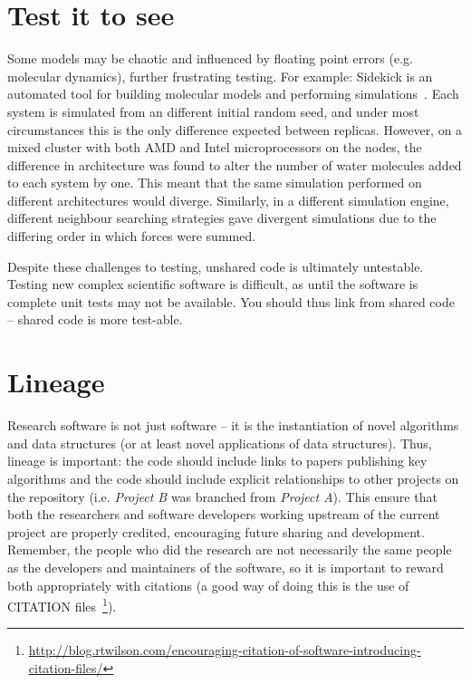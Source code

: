 \documentclass[conference]{IEEEtran}
\begin{document}
\section{Test it to see}

Some models may be chaotic and influenced by floating point errors
(e.g. molecular dynamics), further frustrating testing. For example:
Sidekick is an automated tool for building molecular models and
performing simulations~\cite{Hall2014Sidekick}. Each system is
simulated from an different initial random seed, and under most
circumstances this is the only difference expected between
replicas. However, on a mixed cluster with both AMD and Intel
microprocessors on the nodes, the difference in architecture was found
to alter the number of water molecules added to each system by
one. This meant that the same simulation performed on different
architectures would diverge. Similarly, in a different simulation
engine, different neighbour searching strategies gave divergent
simulations due to the differing order in which forces were summed.

Despite these challenges to testing, unshared code is ultimately
untestable.  Testing new complex scientific software is difficult, as
until the software is complete unit tests may not be available. You
should thus link from shared code -- shared code is more test-able.

\section{Lineage} 

Research software is not just software -- it is the instantiation of
novel algorithms and data structures (or at least novel applications
of data structures). Thus, lineage is important: the code should
include links to papers publishing key algorithms and the
code should include explicit relationships to other projects on the
repository (i.e. {\emph{Project B}} was branched from {\emph{Project
A}}). This ensure that both the researchers and software developers
working upstream of the current project are properly credited,
encouraging future sharing and development. Remember, the people who
did the research are not necessarily the same people as the developers
and maintainers of the software, so it is important to reward both
appropriately with citations (a good way of doing this is the use of
CITATION
files~\footnote{\url{http://blog.rtwilson.com/encouraging-citation-of-software-introducing-citation-files/}}).
\end{document}
